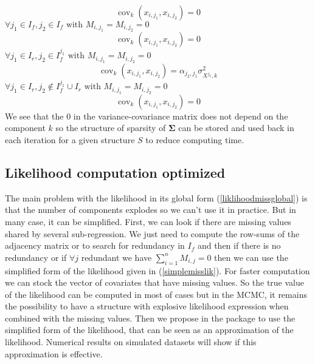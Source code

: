 \documentclass[12pt,a4paper]{report}
\begin{document}
	\begin{equation}
	\operatorname{cov}_{k}(x_{i,j_1},x_{i,j_2})=0
\end{equation}
	$\forall j_1 \in I_f, j_2 \in I_f \textrm{ with } M_{i,j_1}=M_{i,j_2}=0$
	\begin{equation}
	\operatorname{cov}_{k}(x_{i,j_1},x_{i,j_2})=0
\end{equation}
	$\forall j_1 \in I_r, j_2 \in I_f^{j_1} \textrm{ with } M_{i,j_1}=M_{i,j_2}=0$
	\begin{equation}
	\operatorname{cov}_{k}(x_{i,j_1},x_{i,j_2})= \alpha_{j_2,j_1}\sigma_{X^{j_2},k}^2
\end{equation}
$\forall j_1 \in I_r, j_2 \notin I_f^{j_1}\cup I_r \textrm{ with } M_{i,j_1}=M_{i,j_2}=0$
	\begin{equation}
	\operatorname{cov}_{k}(x_{i,j_1},x_{i,j_2})= 0
\end{equation}
We see that the $0$ in the variance-covariance matrix does not depend on the component $k$ so the structure of sparsity of $\boldsymbol{\Sigma}$ can be stored and used back in each iteration for a given structure $S$ to reduce computing time.
	\subsection{Likelihood computation optimized}
		The main problem with the likelihood in its global form (\ref{liklihoodmissglobal}) is that the number of components explodes so we can't use it in practice. But in many case, it can be simplified.
		First, we can look if there are missing values shared by several sub-regression. We just need to compute the  row-sums of the adjacency matrix or to search for redundancy in $I_f$ and then if there is no redundancy or if $\forall j$ redundant we have $\sum_{i=1}^nM_{i,j}=0$ then we can use the simplified form of the likelihood given in (\ref{simplemisslik}). For faster computation we can stock the vector of covariates that have missing values.
		So the true value of the likelihood can be computed in most of cases but in the MCMC, it remains the possibility to have a structure with explosive likelihood expression when combined with the missing values. Then we propose in the package to use the simplified form of the likelihood, that can be seen as an approximation of the likelihood. Numerical results on simulated datasets will show if this approximation is effective.
\end{document}
